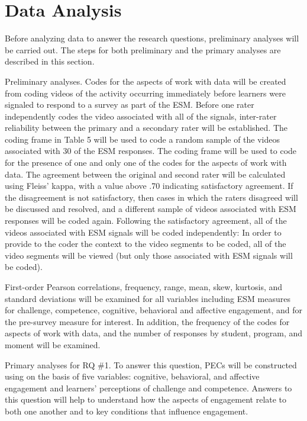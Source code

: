 \documentclass[]{book}
\theoremstyle{definition}
\theoremstyle{definition}
\theoremstyle{definition}
\theoremstyle{remark}
\begin{document}
\section{Data Analysis}\label{data-analysis}

Before analyzing data to answer the research questions, preliminary
analyses will be carried out. The steps for both preliminary and the
primary analyses are described in this section.

Preliminary analyses. Codes for the aspects of work with data will be
created from coding videos of the activity occurring immediately before
learners were signaled to respond to a survey as part of the ESM. Before
one rater independently codes the video associated with all of the
signals, inter-rater reliability between the primary and a secondary
rater will be established. The coding frame in Table 5 will be used to
code a random sample of the videos associated with 30 of the ESM
responses. The coding frame will be used to code for the presence of one
and only one of the codes for the aspects of work with data. The
agreement between the original and second rater will be calculated using
Fleiss' kappa, with a value above .70 indicating satisfactory agreement.
If the disagreement is not satisfactory, then cases in which the raters
disagreed will be discussed and resolved, and a different sample of
videos associated with ESM responses will be coded again. Following the
satisfactory agreement, all of the videos associated with ESM signals
will be coded independently: In order to provide to the coder the
context to the video segments to be coded, all of the video segments
will be viewed (but only those associated with ESM signals will be
coded).

First-order Pearson correlations, frequency, range, mean, skew,
kurtosis, and standard deviations will be examined for all variables
including ESM measures for challenge, competence, cognitive, behavioral
and affective engagement, and for the pre-survey measure for interest.
In addition, the frequency of the codes for aspects of work with data,
and the number of responses by student, program, and moment will be
examined.

Primary analyses for RQ \#1. To answer this question, PECs will be
constructed using on the basis of five variables: cognitive, behavioral,
and affective engagement and learners' perceptions of challenge and
competence. Answers to this question will help to understand how the
aspects of engagement relate to both one another and to key conditions
that influence engagement.
\end{document}
